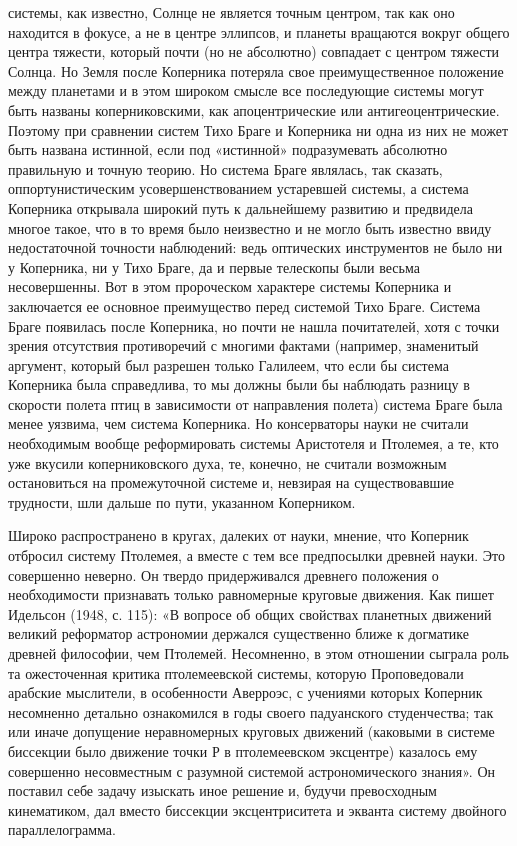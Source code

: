 системы, как известно, Солнце не  является точным центром, так как оно
находится в фокусе, а не в центре эллипсов, и планеты вращаются вокруг
общего центра  тяжести, который  почти (но  не абсолютно)  совпадает с
центром  тяжести  Солнца.  Но  Земля  после  Коперника  потеряла  свое
преимущественное  положение между  планетами и  в этом  широком смысле
все  последующие  системы  могут  быть  названы  коперниковскими,  как
апоцентрические или антигеоцентрические.  Поэтому при сравнении систем
Тихо Браге и Коперника ни одна  из них не может быть названа истинной,
если  под  «истинной»  подразумевать  абсолютно  правильную  и  точную
теорию.  Но система  Браге являлась,  так сказать,  оппортунистическим
усовершенствованием устаревшей системы,  а система Коперника открывала
широкий  путь  к  дальнейшему  развитию  и  предвидела  многое  такое,
что  в  то время  было  неизвестно  и  не  могло быть  известно  ввиду
недостаточной  точности наблюдений:  ведь  оптических инструментов  не
было  ни  у  Коперника,  ни  у  Тихо  Браге,  да  и  первые  телескопы
были  весьма несовершенны.  Вот в  этом пророческом  характере системы
Коперника и  заключается ее основное преимущество  перед системой Тихо
Браге.  Система Браге  появилась после  Коперника, но  почти не  нашла
почитателей,  хотя с  точки зрения  отсутствия противоречий  с многими
фактами (например,  знаменитый аргумент,  который был  разрешен только
Галилеем, что если бы система Коперника была справедлива, то мы должны
были  бы наблюдать  разницу в  скорости полета  птиц в  зависимости от
направления  полета) система  Браге  была менее  уязвима, чем  система
Коперника.  Но  консерваторы  науки   не  считали  необходимым  вообще
реформировать системы  Аристотеля и  Птолемея, а  те, кто  уже вкусили
коперниковского духа,  те, конечно, не считали  возможным остановиться
на промежуточной системе и,  невзирая на существовавшие трудности, шли
дальше по пути, указанном Коперником.

Широко распространено в кругах, далеких от науки, мнение, что Коперник
отбросил  систему Птолемея,  а вместе  с тем  все предпосылки  древней
науки.  Это  совершенно  неверно.  Он  твердо  придерживался  древнего
положения  о  необходимости  признавать  только  равномерные  круговые
движения.  Как пишет  Идельсон (1948,  с.  115): «В  вопросе об  общих
свойствах  планетных движений  великий реформатор  астрономии держался
существенно  ближе  к  догматике   древней  философии,  чем  Птолемей.
Несомненно,  в этом  отношении  сыграла роль  та ожесточенная  критика
птолемеевской  системы,  которую   Проповедовали  арабские  мыслители,
в  особенности  Аверроэс,  с   учениями  которых  Коперник  несомненно
детально ознакомился  в годы своего падуанского  студенчества; так или
иначе допущение  неравномерных круговых  движений (каковыми  в системе
биссекции было  движение точки  Р в птолемеевском  эксцентре) казалось
ему  совершенно  несовместным  с  разумной  системой  астрономического
знания».  Он поставил  себе  задачу изыскать  иное  решение и,  будучи
превосходным  кинематиком,  дал  вместо  биссекции  эксцентриситета  и
экванта систему двойного параллелограмма.


